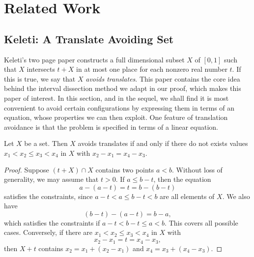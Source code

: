 
\chapter{Related Work}
\label{ch:RelatedWork}

\section{Keleti: A Translate Avoiding Set}

Keleti's two page paper constructs a full dimensional subset $X$ of $[0,1]$ such that $X$ intersects $t + X$ in at most one place for each nonzero real number $t$. If this is true, we say that $X$ \emph{avoids translates}. This paper contains the core idea behind the interval dissection method we adapt in our proof, which makes this paper of interest. In this section, and in the sequel, we shall find it is most convenient to avoid certain configurations by expressing them in terms of an equation, whose properties we can then exploit. One feature of translation avoidance is that the problem is specified in terms of a linear equation.

\begin{lemma}
    Let $X$ be a set. Then $X$ avoids translates if and only if there do not exists values $x_1 < x_2 \leq x_3 < x_4$ in $X$ with $x_2 - x_1 = x_4 - x_3$.
\end{lemma}
\begin{proof}

    Suppose $(t + X) \cap X$ contains two points $a < b$. Without loss of generality, we may assume that $t > 0$. If $a \leq b - t$, then the equation
    \[ a - (a - t) = t = b - (b - t) \]
    satisfies the constraints, since $a - t < a \leq b - t < b$ are all elements of $X$. We also have
    \[ (b - t) - (a - t) = b - a, \]
    which satisfies the constraints if $a - t < b - t \leq a < b$. This covers all possible cases. Conversely, if there are $x_1 < x_2 \leq x_3 < x_4$ in $X$ with
    \[ x_2 - x_1 = t = x_4 - x_3, \]
    then $X + t$ contains $x_2 = x_1 + (x_2 - x_1)$ and $x_4 = x_3 + (x_4 - x_3)$.
\end{proof}


